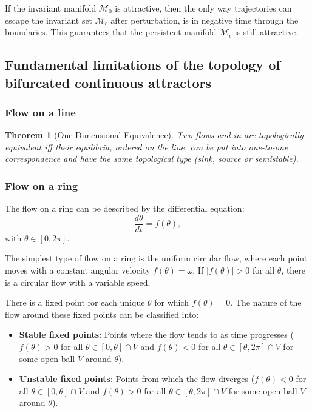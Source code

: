 \documentclass{article} %
\newcounter{ct}
\newcommand{\manifold}{\mathcal{M}}
\newtheorem{theorem}{Theorem}
\theoremstyle{definition}
\theoremstyle{remark}
\begin{document}
If the invariant manifold \(\manifold_{0}\) is attractive, then the only way trajectories can escape the invariant set \(\manifold_{\epsilon}\) after perturbation, is in negative time through the boundaries.
This guarantees that the persistent manifold \(\manifold_{\epsilon}\) is still attractive.


\subsection{Fundamental limitations of the topology of bifurcated continuous attractors}


\subsubsection{Flow on a line}
\begin{theorem}[One Dimensional Equivalence]
Two flows and in are topologically equivalent iff their equilibria, ordered on the line, can be put into one-to-one correspondence and have the same topological type (sink, source or semistable).
\end{theorem}

\subsubsection{Flow on a ring}
The flow on a ring can be described by the differential equation\citep{hirsch2013differential}:
\begin{equation}
\frac{d\theta}{dt} = f(\theta),
\end{equation}with \(\theta\in[0, 2\pi].\)

The simplest type of flow on a ring is the uniform circular flow, where each point moves with a constant angular velocity \(f(\theta)=\omega\).
If \(|f(\theta)|>0\) for all \(\theta\), there is a circular flow with a variable speed.

There is a fixed point for each unique \(\theta\) for which \(f(\theta)=0\).
The nature of the flow around these fixed points can be classified into:
\begin{itemize}
\item\textbf{Stable fixed points}: Points where the flow tends to as time progresses (\(f(\theta)>0\) for all \( \theta\in[0,\theta]\cap V\) and \(f(\theta)<0\) for all \( \theta\in[\theta, 2\pi]\cap V\) for some open ball \(V\) around \(\theta\)).
\item\textbf{Unstable fixed points}: Points from which the flow diverges (\(f(\theta)<0\) for all \( \theta\in[0,\theta]\cap V\) and \(f(\theta)>0\) for all \( \theta\in[\theta, 2\pi]\cap V\) for some open ball \(V\) around \(\theta\)).
\end{itemize}
\end{document}
